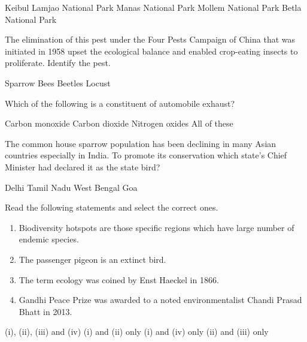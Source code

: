 \begin{questions}
    \begin{randomizeoneparchoices}
        \CorrectChoice Keibul Lamjao National Park
        \choice Manas National Park
        \choice Mollem National Park
        \choice Betla National Park
    \end{randomizeoneparchoices}

    \question The elimination of this pest under the Four Pests Campaign of China that was initiated in 1958 upset the ecological balance and enabled crop-eating insects to proliferate. Identify the pest.

    \begin{randomizeoneparchoices}
        \CorrectChoice Sparrow
        \choice Bees
        \choice Beetles
        \choice Locust
    \end{randomizeoneparchoices}

    \question Which of the following is a constituent of automobile exhaust?

    \begin{choices}
        \choice Carbon monoxide
        \choice Carbon dioxide
        \choice Nitrogen oxides
        \CorrectChoice All of these
    \end{choices}

    \question The common house sparrow population has been declining in many Asian countries especially in India. To promote its conservation which state's Chief Minister had declared it as the state bird?

    \begin{randomizeoneparchoices}
        \CorrectChoice Delhi
        \choice Tamil Nadu
        \choice West Bengal
        \choice Goa
    \end{randomizeoneparchoices}

    \question Read the following statements and select the correct ones.
    \begin{enumerate}[align=left,label=\roman*.]
        \item Biodiversity hotspots are those specific regions which have large number of endemic species.
        \item The passenger pigeon is an extinct bird.
        \item The term ecology was coined by Enst Haeckel in 1866.
        \item Gandhi Peace Prize was awarded to a noted environmentalist Chandi Prasad Bhatt in 2013.
    \end{enumerate}
    \begin{randomizeoneparchoices}
        \CorrectChoice (i), (ii), (iii) and (iv)
        \choice (i) and (ii) only
        \choice (i) and (iv) only
        \choice (ii) and (iii) only
    \end{randomizeoneparchoices}


\end{questions}
